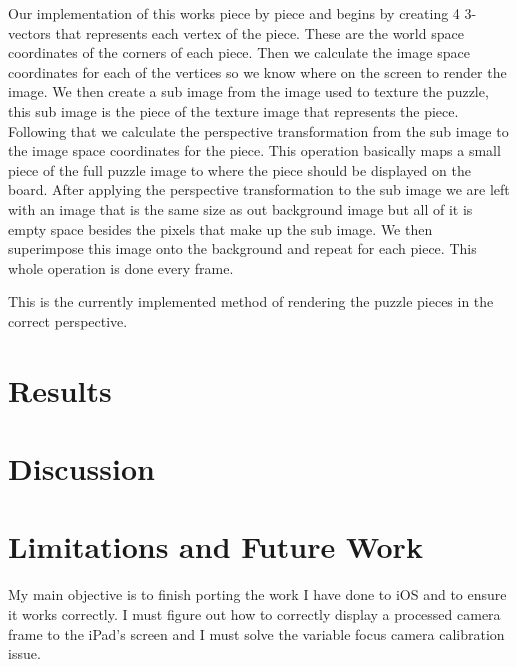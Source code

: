 \documentclass{article}
\begin{document}
Our implementation of this works piece by piece and begins by creating 4 3-vectors that represents each vertex of the piece. These are the world space coordinates of the corners of each piece. Then we calculate the image space coordinates for each of the vertices so we know where on the screen to render the image. We then create a sub image from the image used to texture the puzzle, this sub image is the piece of the texture image that represents the piece. Following that we calculate the perspective transformation from the sub image to the image space coordinates for the piece. This operation basically maps a small piece of the full puzzle image to where the piece should be displayed on the board. After applying the perspective transformation to the sub image we are left with an image that is the same size as out background image but all of it is empty space besides the pixels that make up the sub image. We then superimpose this image onto the background and repeat for each piece. This whole operation is done every frame. 

This is the currently implemented method of rendering the puzzle pieces in the correct perspective.




\section{Results}



\section{Discussion}


\section{Limitations and Future Work}


My main objective is to finish porting the work I have done to iOS and to ensure it works correctly. I must figure out how to correctly display a processed camera frame to the iPad's screen and I must solve the variable focus camera calibration issue.
\end{document}
